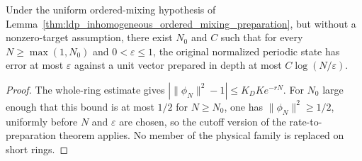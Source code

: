 \begin{lemma}
    \label{thm:ldp_inhomogeneous_eventual_mixing_preparation}
    \leanok
    Under the uniform ordered-mixing hypothesis of
    Lemma~\ref{thm:ldp_inhomogeneous_ordered_mixing_preparation}, but
    without a nonzero-target assumption, there exist $N_0$ and $C$ such
    that for every $N\ge\max(1,N_0)$ and $0<\varepsilon\le1$, the
    original normalized periodic state has error at most $\varepsilon$
    against a unit vector prepared in depth at most $C\log(N/\varepsilon)$.
\end{lemma}
\begin{proof}\leanok
    The whole-ring estimate gives
    $|\|\phi_N\|^2-1|\le K_DK e^{-rN}$.
    For $N_0$ large enough that this bound is at most $1/2$ for $N\ge N_0$,
    one has $\|\phi_N\|^2\ge1/2$, uniformly before $N$ and $\varepsilon$
    are chosen, so the cutoff version of the rate-to-preparation
    theorem applies. No member of the physical family is replaced on short rings.
\end{proof}

